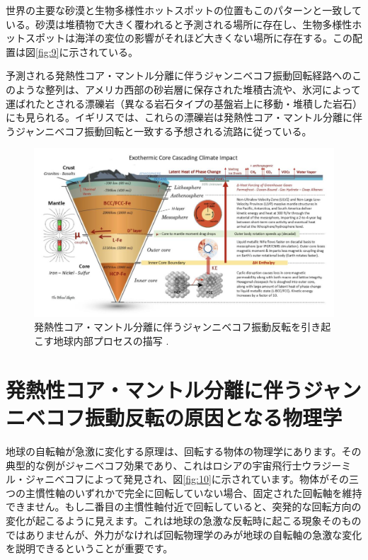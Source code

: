 \documentclass[10pt,twocolumn,letterpaper]{article}
\begin{document}
世界の主要な砂漠と生物多様性ホットスポットの位置もこのパターンと一致している。砂漠は堆積物で大きく覆われると予測される場所に存在し、生物多様性ホットスポットは海洋の変位の影響がそれほど大きくない場所に存在する\cite{28}。この配置は図\ref{fig:9}に示されている。

予測される発熱性コア・マントル分離に伴うジャンニベコフ振動回転経路へのこのような整列は、アメリカ西部の砂岩層に保存された堆積古流や、氷河によって運ばれたとされる漂礫岩（異なる岩石タイプの基盤岩上に移動・堆積した岩石）にも見られる\cite{21}。イギリスでは、これらの漂礫岩は発熱性コア・マントル分離に伴うジャンニベコフ振動回転と一致する予想される流路に従っている\cite{67,68}。

\begin{figure}[t]
\begin{center}
\includegraphics[width=1\textwidth]{layers.jpg}
\end{center}

   \caption{発熱性コア・マントル分離に伴うジャンニベコフ振動反転を引き起こす地球内部プロセスの描写 \cite{129}.}
\label{fig:11}
\end{figure}

\section{発熱性コア・マントル分離に伴うジャンニベコフ振動反転の原因となる物理学}

地球の自転軸が急激に変化する原理は、回転する物体の物理学にあります。その典型的な例がジャニベコフ効果であり、これはロシアの宇宙飛行士ウラジーミル・ジャニベコフによって発見され、図\ref{fig:10}に示されています。物体がその三つの主慣性軸のいずれかで完全に回転していない場合、固定された回転軸を維持できません。もし二番目の主慣性軸付近で回転していると、突発的な回転方向の変化が起こるように見えます。これは地球の急激な反転時に起こる現象そのものではありませんが、外力がなければ回転物理学のみが地球の自転軸の急激な変化を説明できるということが重要です。
\end{document}
